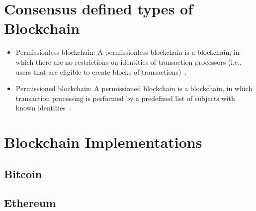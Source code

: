 \section{Consensus defined types of Blockchain}\label{blockchain:consensus_blockchain_types}

\begin{itemize}
  \item Permissionless blockchain: A permissionless blockchain is a blockchain, in which there are no restrictions on identities of transaction processors (i.e., users that are eligible to create blocks of transactions)~\cite{prbc_vs_pubbc}.
  \item Permissioned blockchain: A permissioned blockchain is a blockchain, in which transaction processing is performed by a predefined list of subjects with known identities~\cite{prbc_vs_pubbc}.
\end{itemize}

\begin{table}[]
  \centering
  \caption{Blockchain Types. Source~\cite{hub-bl-types}}
  \label{table:blockchain_types}
\end{table}

\section{Blockchain Implementations}\label{blockchain_implementations}

\subsection{Bitcoin}\label{blockchain:impl:bitcoin}
\subsection{Ethereum}\label{blockchain:impl:ethereum}

